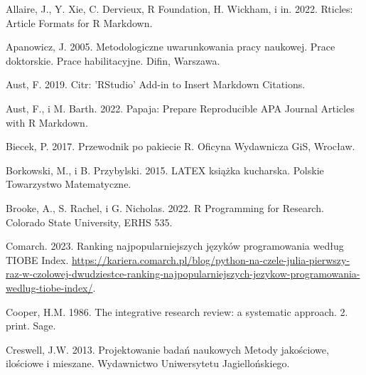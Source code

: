 \documentclass[
  12pt,
]{article}
\newlength{\cslhangindent}
\newlength{\cslentryspacingunit} %
\newenvironment{CSLReferences}[2] %
 {%
  \setlength{\parindent}{0pt}
  \ifodd #1
  \let\oldpar\par
  \def\par{\hangindent=\cslhangindent\oldpar}
  \fi
  \setlength{\parskip}{#2\cslentryspacingunit}
 }%
 {}
\begin{document}
\hypertarget{refs}{}
\begin{CSLReferences}{1}{0}
\leavevmode{}%
Allaire, J., Y. Xie, C. Dervieux, R Foundation, H. Wickham, i in. 2022.
Rticles: {Article} Formats for {R} Markdown.

\leavevmode{}%
Apanowicz, J. 2005. Metodologiczne uwarunkowania pracy naukowej. Prace
doktorskie. Prace habilitacyjne. Difin, Warszawa.

\leavevmode{}%
Aust, F. 2019. Citr: '{RStudio}' Add-in to Insert Markdown Citations.

\leavevmode{}%
Aust, F., i M. Barth. 2022. Papaja: {Prepare} Reproducible {APA} Journal
Articles with {R Markdown}.

\leavevmode{}%
Biecek, P. 2017. Przewodnik po pakiecie R. Oficyna Wydawnicza GiS,
Wroc{ł}aw.

\leavevmode{}%
Borkowski, M., i B. Przybylski. 2015. LATEX ksi{ą}{ż}ka kucharska.
Polskie Towarzystwo Matematyczne.

\leavevmode{}%
Brooke, A., S. Rachel, i G. Nicholas. 2022. R {Programming} for
{Research}. {Colorado State University, ERHS 535}.

\leavevmode{}%
Comarch. 2023. Ranking najpopularniejszych języków programowania według
TIOBE Index.
\url{https://kariera.comarch.pl/blog/python-na-czele-julia-pierwszy-raz-w-czolowej-dwudziestce-ranking-najpopularniejszych-jezykow-programowania-wedlug-tiobe-index/}.

\leavevmode{}%
Cooper, H.M. 1986. The integrative research review: a systematic
approach. 2. print. Sage.

\leavevmode{}%
Creswell, J.W. 2013. Projektowanie badań naukowych Metody jakościowe,
ilościowe i mieszane. Wydawnictwo Uniwersytetu Jagiellońskiego.


\end{CSLReferences}
\end{document}
